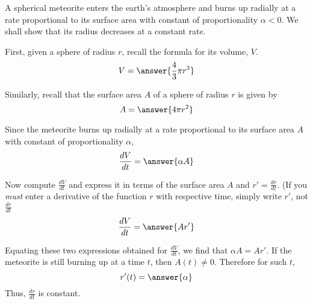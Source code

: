 \documentclass{ximera}
\begin{document}
\begin{exercise}
A spherical meteorite enters the earth's atmosphere and burns up radially at a rate proportional to its surface area with constant of proportionality $\alpha<0$. We shall show that its radius decreases at a constant rate. 

First, given a sphere of radius $r$, recall the formula for its volume, $V$.
\[
V=\answer{\frac{4}{3}\pi r^3}
\]
\begin{exercise}
Similarly, recall that the surface area $A$ of a sphere of radius $r$ is given by
\[
A=\answer{4\pi r^2}
\]
\begin{exercise}
Since the meteorite burns up radially at a rate proportional to its surface area $A$ with constant of proportionality $\alpha$, 
\[
\dfrac{dV}{dt}=\answer{\alpha A}
\]
\begin{exercise}
Now compute $\frac{dV}{dt}$ and express it in terms of the surface area $A$ and $r'=\frac{dr}{dt}$. (If you \textit{must} enter a derivative of the function $r$ with respective time, simply write $r'$, not $\frac{dr}{dt}$
\[
\frac{dV}{dt}=\answer{A r'}
\]
\begin{exercise}
Equating these two expressions obtained for $\frac{dV}{dt}$, we find that $\alpha A=A r'$. If the meteorite is still burning up at a time $t$, then $A(t)\ne 0$. Therefore for such $t$,
\[
r'(t)=\answer{\alpha}
\]
Thus, $\frac{dr}{dt}$ is constant.
\end{exercise}
\end{exercise}
\end{exercise}
\end{exercise}
\end{exercise}
\end{document}
